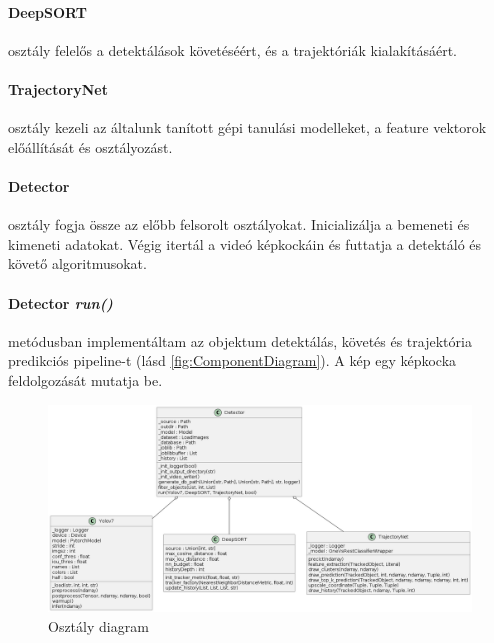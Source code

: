 \documentclass[12pt,a4paper]{article}
\begin{document}
\paragraph{DeepSORT} osztály felelős a detektálások követéséért, és a trajektóriák kialakításáért.
\paragraph{TrajectoryNet} osztály kezeli az általunk tanított gépi tanulási modelleket, a feature vektorok előállítását és osztályozást.
\paragraph{Detector} osztály fogja össze az előbb felsorolt osztályokat. Inicializálja a bemeneti és kimeneti adatokat. Végig itertál a videó képkockáin és futtatja a detektáló és követő algoritmusokat.
\paragraph{Detector \textit{run()}} metódusban implementáltam az objektum detektálás, követés és trajektória predikciós pipeline-t (lásd \ref{fig:ComponentDiagram}). A kép egy képkocka feldolgozását mutatja be.

\begin{figure}[H]
    \includegraphics[width=1\columnwidth]{ClassArchitectureDiagram.png}
    \caption{Osztály diagram}
    \label{fig:ClassDiagram}
\end{figure}
\end{document}
